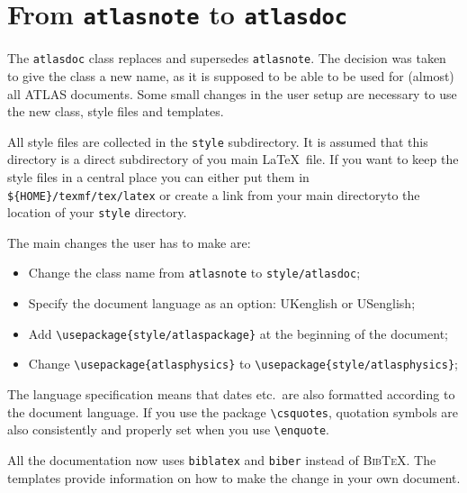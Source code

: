 \documentclass[koma,UKenglish]{style/atlasdoc}
\newcommand{\BibTeX}{\textsc{Bib\TeX}}
\newcommand{\Macro}[1]{\texttt{\textbackslash #1}\xspace}
\begin{document}
\section{From \texttt{atlasnote} to \texttt{atlasdoc}}
\label{sec:oldnote}

The \texttt{atlasdoc} class replaces and supersedes \texttt{atlasnote}.
The decision was taken to give the class a new name, as it is supposed to be
able to be used for (almost) all ATLAS documents.
Some small changes in the user setup are necessary to use the new
class, style files and templates.

All style files are collected in the \texttt{style} subdirectory.
It is assumed that this directory is a direct subdirectory of you main \LaTeX\ file.
If you want to keep the style files in a central place you can either put them in
\verb|${HOME}/texmf/tex/latex| or create a link from your main directoryto the location of
your \texttt{style} directory.

The main changes the user has to make are:
\begin{itemize}
\item Change the class name from \texttt{atlasnote} to \texttt{style/atlasdoc};
\item Specify the document language as an option: UKenglish or USenglish;
\item Add \verb|\usepackage{style/atlaspackage}| at the beginning of the document;
\item Change \verb|\usepackage{atlasphysics}| to \verb|\usepackage{style/atlasphysics}|; 
\end{itemize}

The language specification means that dates etc.\ are also formatted according to 
the document language. 
If you use the package \Macro{csquotes}, quotation symbols are also consistently and properly set
when you use \Macro{enquote}.

All the documentation now uses \texttt{biblatex} and \texttt{biber} instead of \BibTeX.
The templates provide information on how to make the change in your own document.
\end{document}
